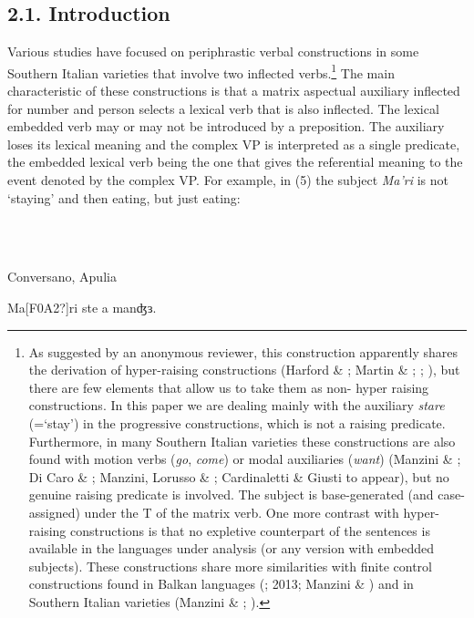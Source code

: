 \documentclass[output=paper]{langsci/langscibook}
\begin{document}
\subsection{ 2.1. Introduction}

Various studies have focused on periphrastic verbal constructions in some Southern Italian varieties that involve two inflected verbs.\footnote{As suggested by an anonymous reviewer, this construction apparently shares the derivation of hyper-raising constructions (Harford \& \citealt{Perez1985}; Martin \& \citealt{Nunes2005}; \citealt{Nunes2008}; \citealt{Zeller2006}), but there are few elements that allow us to take them as non- hyper raising constructions. In this paper we are dealing mainly with the auxiliary \textit{stare} (=‘stay’) in the progressive constructions, which is not a raising predicate. Furthermore, in many Southern Italian varieties these constructions are also found with motion verbs (\textit{go}, \textit{come}) or modal auxiliaries (\textit{want}) (Manzini \& \citealt{Savoia2005}; Di Caro \& \citealt{Giusti2015}; Manzini, Lorusso \& \citealt{Savoia2017}; Cardinaletti \& Giusti to appear), but no genuine raising predicate is involved. The subject is base-generated (and case-assigned) under the T of the matrix verb. One more contrast with hyper-raising constructions is that no expletive counterpart of the sentences is available in the languages under analysis (or any version with embedded subjects). These constructions share more similarities with finite control constructions found in Balkan languages (\citealt{Landau2004}; 2013; Manzini \& \citealt{Rousssou2000}) and in Southern Italian varieties (Manzini \& \citealt{Savoia2005}; \citealt{Ledgeway2015}).}  The main characteristic of these constructions is that a matrix aspectual auxiliary inflected for number and person selects a lexical verb that is also inflected. The lexical embedded verb may or may not be introduced by a preposition. The auxiliary loses its lexical meaning and the complex VP is interpreted as a single predicate, the embedded lexical verb being the one that gives the referential meaning to the event denoted by the complex VP. For example, in (5) the subject \textit{Ma’ri} is not ‘staying’ and then eating, but just eating:

\ea%
    \label{ex:key:5}
    \gll\\
        \\
    \glt
    \z

          Conversano, Apulia

Ma[F0A2?]ri  ste     a   manʤɜ.
\end{document}
